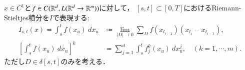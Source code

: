 \begin{screen}
	\begin{dfn}[$C^1$-級のパスに対する汎関数]
		$x \in C^1$と$f \in C(\mathbb{R}^d,L(\mathbb{R}^d \rightarrow \mathbb{R}^m))$に対して，
		$[s,t] \subset [0,T]$におけるRiemann-Stieltjes積分を$I$で表現する:
		\begin{align}
			I_{s,t}(x) = \int_s^t f(x_u)\ dx_u 
			&\coloneqq \lim_{|D| \to 0}
				\sum_{D} f(x_{t_{i-1}})(x_{t_i} - x_{t_{i-1}}), \\
			\left[ \int_s^t f(x_u)\ dx_u \right]^k
			&= \sum_{j=1}^d \int_s^t f^k_j(x_u)\ dx^j_u,
			\quad (k = 1,\cdots,m).
		\end{align}
		ただし$D \in \delta[s,t]$のみを考える．
	\end{dfn}
\end{screen}

\begin{comment}
\begin{screen}
	\begin{thm}[$I$の加法性・線型性・絶対値]
	\label{thm:linearity_of_Riemann_Stieltjes_integral}
		任意の$x \in C^1,\ f,g \in C(\R^d,L(\R^d \rightarrow \R^m)),\ \alpha,\beta \in \R$に対して次が成立する:
		\begin{description}
			\item[(1)] $I^f_{s,u}(x) + I^f_{u,t}(x) = I^f_{s,t}(x)$,
			
			\item[(2)] $I^{(\alpha f + \beta g)}_{s,t}(x) = \alpha I^f_{s,t}(x) + \beta I^g_{s,t}(x)$.
			
			\item[(3)] $\left| I^f_{s,t}(x) \right| \leq \int_s^t |f(x_u)| |\dot{x}_u|\ du$.
		\end{description}
	\end{thm}
\end{screen}


\end{comment}

